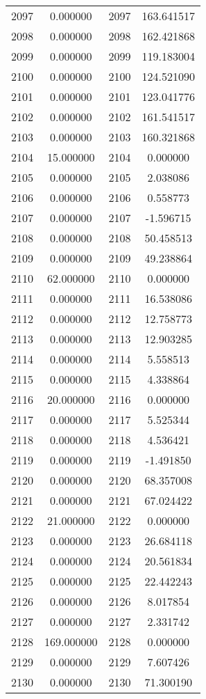 \documentclass[12pt]{article}
\begin{document}
\begin{longtable}{@{}cccc@{}}
2097 & 0.000000 & 2097 & 163.641517 \\
2098 & 0.000000 & 2098 & 162.421868 \\
2099 & 0.000000 & 2099 & 119.183004 \\
2100 & 0.000000 & 2100 & 124.521090 \\
2101 & 0.000000 & 2101 & 123.041776 \\
2102 & 0.000000 & 2102 & 161.541517 \\
2103 & 0.000000 & 2103 & 160.321868 \\
2104 & 15.000000 & 2104 & 0.000000 \\
2105 & 0.000000 & 2105 & 2.038086 \\
2106 & 0.000000 & 2106 & 0.558773 \\
2107 & 0.000000 & 2107 & -1.596715 \\
2108 & 0.000000 & 2108 & 50.458513 \\
2109 & 0.000000 & 2109 & 49.238864 \\
2110 & 62.000000 & 2110 & 0.000000 \\
2111 & 0.000000 & 2111 & 16.538086 \\
2112 & 0.000000 & 2112 & 12.758773 \\
2113 & 0.000000 & 2113 & 12.903285 \\
2114 & 0.000000 & 2114 & 5.558513 \\
2115 & 0.000000 & 2115 & 4.338864 \\
2116 & 20.000000 & 2116 & 0.000000 \\
2117 & 0.000000 & 2117 & 5.525344 \\
2118 & 0.000000 & 2118 & 4.536421 \\
2119 & 0.000000 & 2119 & -1.491850 \\
2120 & 0.000000 & 2120 & 68.357008 \\
2121 & 0.000000 & 2121 & 67.024422 \\
2122 & 21.000000 & 2122 & 0.000000 \\
2123 & 0.000000 & 2123 & 26.684118 \\
2124 & 0.000000 & 2124 & 20.561834 \\
2125 & 0.000000 & 2125 & 22.442243 \\
2126 & 0.000000 & 2126 & 8.017854 \\
2127 & 0.000000 & 2127 & 2.331742 \\
2128 & 169.000000 & 2128 & 0.000000 \\
2129 & 0.000000 & 2129 & 7.607426 \\
2130 & 0.000000 & 2130 & 71.300190 \\

\end{longtable}
\end{document}
